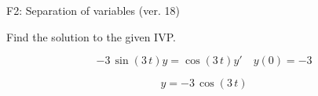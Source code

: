 \begin{exercise}
  \begin{exerciseTitle}F2: Separation of variables (ver. 18)\end{exerciseTitle}
  \begin{exerciseStatement}
    
Find the solution to the given IVP.

    
\[-3 \, \sin\left(3 \, t\right) y= \cos\left(3 \, t\right) y'\hspace{1em} y\left( 0 \right)= -3\]

  \end{exerciseStatement}
  \begin{exerciseAnswer}
    
\[y= -3 \, \cos\left(3 \, t\right)\]

  \end{exerciseAnswer}
\end{exercise}